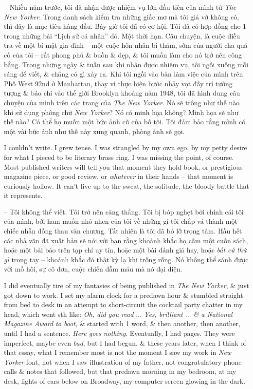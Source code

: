 \documentclass{article}
\begin{document}
\begin{itemize}
	-- Nhiều năm trước, tôi đã nhận được nhiệm vụ lớn đầu tiên của mình từ {\it The New Yorker}. Trong danh sách kiểm tra những giấc mơ mà tôi giả vờ không có, thì đây là mục tiêu hàng đầu. Bây giờ tôi đã có cơ hội. Tôi đã có hợp đồng cho 1 trong những bài ``Lịch sử cá nhân'' đó. Một thời hạn. Câu chuyện, là cuộc điều tra về một bí mật gia đình -- một cuộc hôn nhân bi thảm, sớm của người cha quá cố của tôi -- rất phong phú \& buồn \& đẹp, \& tôi muốn làm cho nó trở nên công bằng. Trong những ngày \& tuần sau khi nhận được nhiệm vụ, tôi ngồi xuống mỗi sáng để viết, \& chẳng có gì xảy ra. Khi tôi ngồi vào bàn làm việc của mình trên Phố West 92nd ở Manhattan, thay vì thực hiện bước nhảy vọt đầy trí tưởng tượng \& báo chí vào thế giới Brooklyn khoảng năm 1948, tôi đã hình dung câu chuyện của mình trên các trang của {\it The New Yorker}. Nó sẽ trông như thế nào khi sử dụng phông chữ {\it New Yorker}? Nó có minh họa không? Minh họa sẽ như thế nào? Có thể họ muốn một bức ảnh cũ của bố tôi. Tôi đảm bảo rằng mình có một vài bức ảnh như thế này xung quanh, phòng ảnh sẽ gọi.
		
	I couldn't write. I grew tense. I was strangled by my own ego, by my petty desire for what I pieced to be literary brass ring. I was missing the point, of course.  Most published writers will tell you that moment they hold book, or prestigious magazine piece, or good review, or {\it whatever} in their hands -- that moment is curiously hollow. It can't live up to the sweat, the solitude, the bloody battle that it represents.
	
	-- Tôi không thể viết. Tôi trở nên căng thẳng. Tôi bị bóp nghẹt bởi chính cái tôi của mình, bởi ham muốn nhỏ nhen của tôi về những gì tôi chắp vá thành một chiếc nhẫn đồng thau văn chương. Tất nhiên là tôi đã bỏ lỡ trọng tâm.  Hầu hết các nhà văn đã xuất bản sẽ nói với bạn rằng khoảnh khắc họ cầm một cuốn sách, hoặc một bài báo trên tạp chí uy tín, hoặc một bài đánh giá hay, hoặc {\it bất cứ thứ gì} trong tay -- khoảnh khắc đó thật kỳ lạ khi trống rỗng. Nó không thể sánh được với mồ hôi, sự cô đơn, cuộc chiến đẫm máu mà nó đại diện.
	
	I did eventually tire of my fantasies of being published in {\it The New Yorker}, \& just got down to work. I set my alarm clock for a predawn hour \& stumbled straight from bed to desk in an attempt to short-circuit the cocktail party chatter in my head, which went sth like: {\it Oh, did you read $\ldots$ Yes, brilliant $\ldots$ \& a National Magazine Award to boot}, \& started with 1 word, \& then another, then another, until I had a sentence. {\it Here goes nothing}. Eventually, I had pages. They were imperfect, maybe even {\it bad}, but I had begun. \& these years later, when I think of that essay, what I remember most is not the moment I saw my work in {\it New Yorker} font, not when I saw illustration of my father, not congratulatory phone calls \& notes that followed, but  that predawn morning in my bedroom, at my desk, lights of cars below on Broadway, my computer screen glowing in the dark.
	

\end{itemize}
\end{document}
